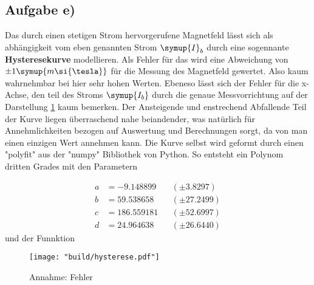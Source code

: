 \subsection{Aufgabe e)}
\label{sec:auswertung_hyst}

 
 Das durch einen stetigen Strom hervorgerufene Magnetfeld lässt sich als abhängigkeit vom eben genannten Strom $\symup{I}_b$ durch eine sogennante \textbf{Hysteresekurve} modellieren.
 Als Fehler für das wird eine Abweichung von $\pm 1 \symup{m\si{\tesla}}$ für die Messung des Magnetfeld gewertet. Also kaum wahrnehmbar bei hier sehr hohen Werten. Ebeneso lässt sich der Fehler für die x-Achse, den teil des Stroms 
 $\symup{I_b}$ durch die genaue Messvorrichtung auf der Darstellung \ref{fig:Bfeld} kaum bemerken.
 Der Ansteigende und enstrechend Abfallende Teil der Kurve liegen überraschend nahe beiandender, was natürlich für Annehmlichkeiten bezogen auf Auswertung und Berechnungen sorgt, da von man einen einzigen Wert annehmen kann.
 Die Kurve selbst wird geformt durch einen "polyfit" aus der "numpy" Bibliothek von Python. So entsteht ein Polynom dritten Grades mit den Parametern 

\begin{align*}
a &= -9.148899 &&(\pm 3.8297) \\
b &= 59.538658 &&(\pm 27.2499) \\
c &= 186.559181 &&(\pm 52.6997) \\
d &= 24.964638 &&(\pm 26.6440 )
\end{align*}
 und der Funnktion

\begin{figure}
    \centering
    \texttt{[image: "build/hysterese.pdf"]}
    \caption{Annahme: Fehler }
    \label{fig:Bfeld}
 \end{figure}
